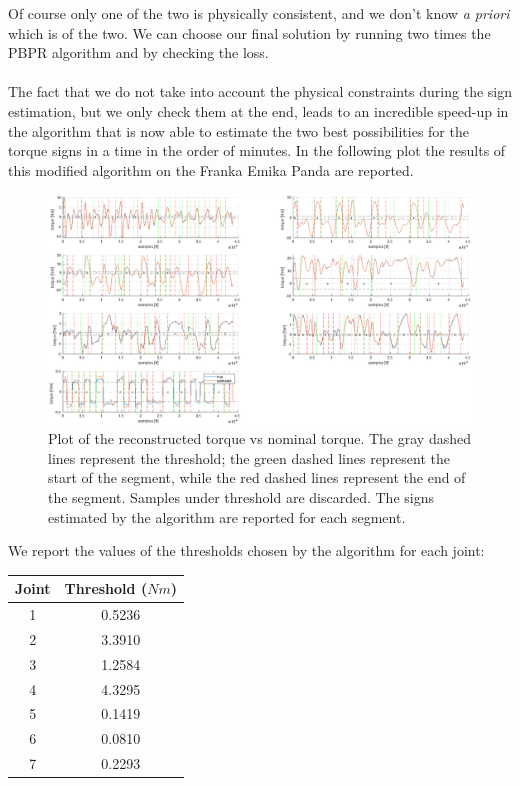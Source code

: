 \documentclass{article}
\begin{document}
Of course only one of the two is physically consistent, and we don't know \emph{a priori} which is of the two. We can choose our final solution by running two times the PBPR algorithm and by checking the loss.\\\\
The fact that we do not take into account the physical constraints during the sign estimation, but we only check them at the end, leads to an incredible speed-up in the algorithm that is now able to estimate the two best possibilities for the torque signs in a time in the order of minutes.
In the following plot the results of this modified algorithm on the Franka Emika Panda are reported.
\FloatBarrier
\begin{figure}
\centering
\includegraphics[width=1\textwidth]{images/franka_result_crop.eps}
\caption{Plot of the reconstructed torque vs nominal torque. The gray dashed lines represent the threshold; the green dashed lines represent the start of the segment, while the red dashed lines represent the end of the segment. Samples under threshold are discarded. The signs estimated by the algorithm are reported for each segment.}
\end{figure}
\FloatBarrier

We report the values of the thresholds chosen by the algorithm for each joint:

\begin{table}[!htbp]
\centering
\begin{tabular}{|c|c|}
\hline
Joint & Threshold ($Nm$)\\ 
\hline
1 & 0.5236\\
2 & 3.3910\\
3 & 1.2584\\
4 & 4.3295\\
5 & 0.1419\\
6 & 0.0810\\
7 & 0.2293\\
\hline
\end{tabular}
\end{table}
\FloatBarrier
\end{document}
